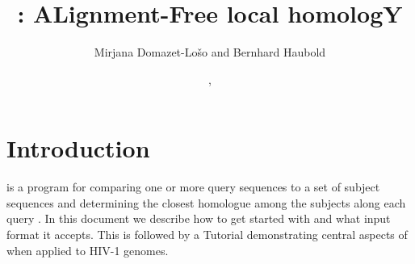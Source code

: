 \documentclass[a4paper]{article}
\begin{document}
\title{: ALignment-Free local homologY}
\author{Mirjana Domazet-Lo\v{s}o and Bernhard Haubold}
\date{\!\!, }
\maketitle

\section{Introduction}
 is a program for comparing one or more query sequences to a
set of subject sequences and determining the closest homologue among
the subjects along each query \cite{dom11:ali}. In this document we
describe how to get started with  and what input format it
accepts. This is followed by a Tutorial demonstrating central aspects
of  when applied to HIV-1 genomes.
\end{document}
